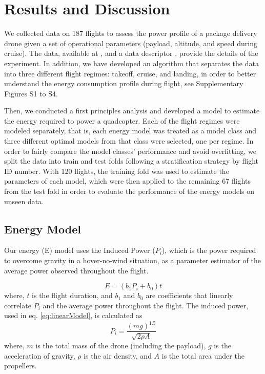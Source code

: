 \documentclass{article}
\begin{document}
\section{Results and Discussion}

We collected data on 187 flights to assess the power profile of a package delivery drone given a set of operational parameters (payload, altitude, and speed during cruise). The data, available at \cite{Rodrigues2020a}, and a data descriptor \cite{Rodrigues2021In-flightDelivery}, provide the details of the experiment. In addition, we have developed an algorithm that separates the data into three different flight regimes: takeoff, cruise, and landing, in order to better understand the energy consumption profile during flight, see Supplementary Figures S1 to S4. 

Then, we conducted a first principles analysis and developed a model to estimate the energy required to power a quadcopter. Each of the flight regimes were modeled separately, that is, each energy model was treated as a model class and three different optimal models from that class were selected, one per regime. In order to fairly compare the model classes' performance and avoid overfitting, we split the data into train and test folds following a stratification strategy by flight ID number. With 120 flights, the training fold was used to estimate the parameters of each model, which were then applied to the remaining 67 flights from the test fold in order to evaluate the performance of the energy models on unseen data.  

\subsection{Energy Model}
Our energy (E) model uses the Induced Power ($P_{i}$), which is the power required to overcome gravity in a hover-no-wind situation, as a parameter estimator of the average power observed throughout the flight.

\begin{equation}
    E = (b_{1}P_{i} + b_{0})t
    \label{eq:linearModel}
\end{equation}
where, $t$ is the flight duration, and $b_{1}$ and $b_{0}$ are coefficients that linearly correlate $P_{i}$ and the average power throughout the flight.
The induced power, used in eq. \ref{eq:linearModel}, is calculated as 
\begin{equation}
    P_{i} = \frac{\left(mg\right)^{1.5}}{\sqrt{2\rho A}}
\end{equation}
where, $m$ is the total mass of the drone (including the payload), $g$ is the acceleration of gravity, $\rho$ is the air density, and $A$ is the total area under the propellers. 
\end{document}

